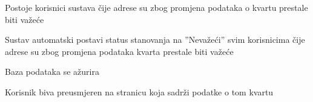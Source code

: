 \begin{packed_item}
\begin{packed_item}
							\item[3.b] Postoje korisnici sustava čije adrese su zbog promjena podataka o kvartu prestale biti važeće
							\item[] \begin{packed_enum}
								
								\item Sustav automatski postavi status stanovanja na ”Nevažeći” svim korisnicima čije adrese su zbog promjena podataka kvarta prestale biti važeće
								\item Baza podataka se ažurira
								\item Korisnik biva preusmjeren na stranicu koja sadrži podatke o tom kvartu
								
							\end{packed_enum}
							
						\end{packed_item}
					\end{packed_item}
					
